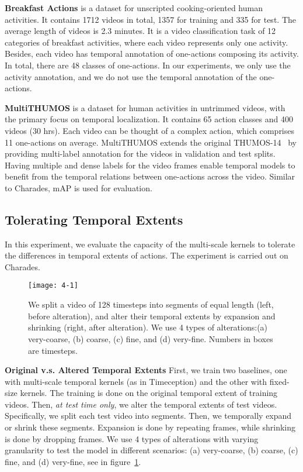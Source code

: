 \documentclass[10pt,twocolumn,letterpaper]{article}
\newcommand{\partitle}[1]{\noindent\textbf{#1}}
\begin{document}
\partitle{Breakfast Actions}
is a dataset for unscripted cooking-oriented human activities.
It contains 1712 videos in total, 1357 for training and 335 for test.
The average length of videos is 2.3 minutes.
It is a video classification task of 12 categories of breakfast activities, where each video represents only one activity.
Besides, each video has temporal annotation of one-actions composing its activity.
In total, there are 48 classes of one-actions.
In our experiments, we only use the activity annotation, and we do not use the temporal annotation of the one-actions.

\partitle{MultiTHUMOS}
is a dataset for human activities in untrimmed videos, with the primary focus on temporal localization.
It contains 65 action classes and 400 videos (30 hrs).
Each video can be thought of a complex action, which comprises 11 one-actions on average.
MultiTHUMOS extends the original THUMOS-14~\cite{idrees2017thumos} by providing multi-label annotation for the videos in validation and test splits.
Having multiple and dense labels for the video frames enable temporal models to benefit from the temporal relations between one-actions across the video.
Similar to Charades, mAP is used for evaluation.

\subsection{Tolerating Temporal Extents}
In this experiment, we evaluate the capacity of the multi-scale kernels to tolerate the differences in temporal extents of actions.
The experiment is carried out on Charades.

\begin{figure}[!ht]
\begin{center}
\texttt{[image: 4-1]}
\end{center}
\caption{
We split a video of 128 timesteps into segments of equal length (left, before alteration), and alter their temporal extents by expansion and shrinking (right, after alteration).
We use 4 types of alterations:(a) very-coarse, (b) coarse, (c) fine, and (d) very-fine.
Numbers in boxes are timesteps.}
\label{fig:4-1}
\vspace*{-0mm}
\end{figure}

\partitle{Original v.s. Altered Temporal Extents}
First, we train two baselines, one with multi-scale temporal kernels (as in Timeception) and the other with fixed-size kernels.
The training is done on the original temporal extent of training videos.
Then, \emph{at test time only}, we alter the temporal extents of test videos.
Specifically, we split each test video into segments.
Then, we temporally expand or shrink these segments.
Expansion is done by repeating frames, while shrinking is done by dropping frames.
We use 4 types of alterations with varying granularity to test the model in different scenarios: (a) very-coarse, (b) coarse, (c) fine, and (d) very-fine, see in figure~\ref{fig:4-1}.
\end{document}
